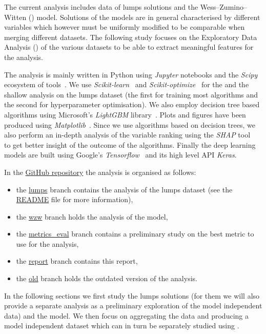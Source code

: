 The current analysis includes data of lumps solutions and the Wess--Zumino--Witten (\wzw)  model.
Solutions of the models are in general characterised by different variables which however must be uniformly modified to be comparable when merging different datasets.
The following study focuses on the Exploratory Data Analysis (\eda) of the various datasets to be able to extract meaningful features for the \ml analysis.

The analysis is mainly written in Python using \emph{Jupyter} notebooks and the \emph{Scipy} ecosystem of tools~\Cite{Virtanen:2020:SciPyFundamentalAlgorithms}.
We use \emph{Scikit-learn}~\Cite{Pedregosa:2011:ScikitlearnMachineLearning} and \emph{Scikit-optimize}~\Cite{Head:2018:ScikitoptimizeScikitoptimizeV0} for the \eda and the shallow \ml analysis on the lumps dataset (the first for training most algorithms and the second for hyperparameter optimisation).
We also employ decision tree based algorithms using Microsoft's \emph{LightGBM} library~\Cite{Ke:2017:LightGBMHighlyEfficient}.
Plots and figures have been produced using \emph{Matplotlib}~\Cite{Hunter:2007:Matplotlib2DGraphics}.
Since we use algorithms based on decision trees, we also perform an in-depth analysis of the variable ranking using the \emph{SHAP} tool~\Cite{Lundberg:2020:LocalExplanationsGlobal} to get better insight of the outcome of the algorithms.
Finally the deep learning models are built using Google's \emph{Tensorflow}~\Cite{Abadi:2015:TensorFlowLargescaleMachine} and its high level API \emph{Keras}.

In the \href{https://github.com/thesfinox/ml-sft-trunc}{GitHub repository} the analysis is organised as follows:
\begin{itemize}
  \item the \href{https://github.com/thesfinox/ml-sft-trunc}{lumps} branch contains the analysis of the lumps dataset (see the \href{https://github.com/thesfinox/ml-sft-trunc/blob/lumps/README.md}{README} file for more information),

  \item the \href{https://github.com/thesfinox/ml-sft-trunc/tree/wzw}{wzw} branch holds the analysis of the \wzw model,

  \item the \href{https://github.com/thesfinox/ml-sft-trunc/tree/metrics_eval}{metrics\_eval} branch contains a preliminary study on the best metric to use for the analysis,

  \item the \href{https://github.com/thesfinox/ml-sft-trunc/tree/report}{report} branch contains this report,

  \item the \href{https://github.com/thesfinox/ml-sft-trunc/tree/old}{old} branch holds the outdated version of the analysis.
\end{itemize}

In the following sections we first study the lumps solutions (for them we will also provide a separate \ml analysis as a preliminary exploration of the model independent data) and the \wzw model.
We then focus on aggregating the data and producing a model independent dataset which can in turn be separately studied using \ml.

